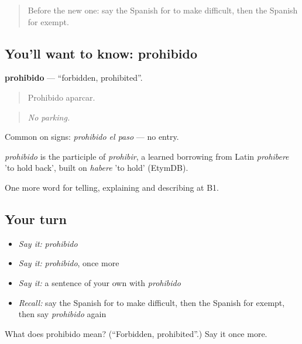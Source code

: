 \label{lesson:ES-C621-prohibido}



\begin{quote}
Before the new one: say the Spanish for to make difficult, then the Spanish for exempt.
\end{quote}

\subsection*{You'll want to know: prohibido}
\textbf{prohibido} — \textquotedblleft{}forbidden, prohibited\textquotedblright{}.

\begin{quote}
Prohibido aparcar.
\end{quote}

\begin{quote}
\emph{No parking.}
\end{quote}

Common on signs: \emph{prohibido el paso} — no entry.

\begin{cousinweb}
\emph{prohibido} is the participle of \emph{prohibir}, a learned borrowing from Latin \emph{prohibere} 'to hold back', built on \emph{habere} 'to hold' (EtymDB).
\end{cousinweb}

\begin{grammarlens}[title={What you've built}]
One more word for telling, explaining and describing at B1.
\end{grammarlens}

\subsection*{Your turn}
\begin{itemize}
\raggedright
  \item \emph{Say it:} \emph{prohibido}
  \item \emph{Say it:} \emph{prohibido}, once more
  \item \emph{Say it:} a sentence of your own with \emph{prohibido}
  \item \emph{Recall:} say the Spanish for to make difficult, then the Spanish for exempt, then say \emph{prohibido} again
\end{itemize}

\begin{tcolorbox}[breakable,colback=teal!4,colframe=teal!35!black,title={Before you move on}]
What does prohibido mean? (\textquotedblleft{}Forbidden, prohibited\textquotedblright{}.) Say it once more.
\end{tcolorbox}
